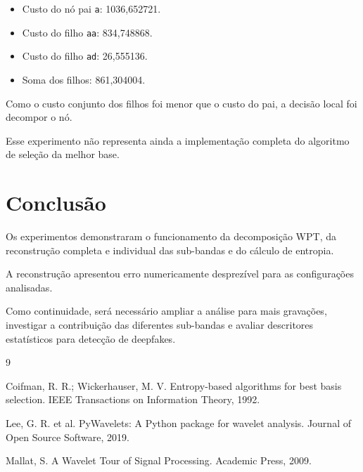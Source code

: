 \documentclass[12pt,a4paper]{article}
\begin{document}
\begin{itemize}
\item Custo do nó pai \texttt{a}: 1036,652721.
\item Custo do filho \texttt{aa}: 834,748868.
\item Custo do filho \texttt{ad}: 26,555136.
\item Soma dos filhos: 861,304004.
\end{itemize}

Como o custo conjunto dos filhos foi menor
que o custo do pai, a decisão local foi
decompor o nó.

Esse experimento não representa ainda
a implementação completa do algoritmo
de seleção da melhor base.

\section{Conclusão}

Os experimentos demonstraram o funcionamento
da decomposição WPT, da reconstrução completa
e individual das sub-bandas e do cálculo de
entropia.

A reconstrução apresentou erro numericamente
desprezível para as configurações analisadas.

Como continuidade, será necessário ampliar
a análise para mais gravações, investigar
a contribuição das diferentes sub-bandas
e avaliar descritores estatísticos para
detecção de deepfakes.

\begin{thebibliography}{9}

Coifman, R. R.; Wickerhauser, M. V.
Entropy-based algorithms for best basis selection.
IEEE Transactions on Information Theory, 1992.

Lee, G. R. et al.
PyWavelets: A Python package for wavelet analysis.
Journal of Open Source Software, 2019.

Mallat, S.
A Wavelet Tour of Signal Processing.
Academic Press, 2009.

\end{thebibliography}
\end{document}
